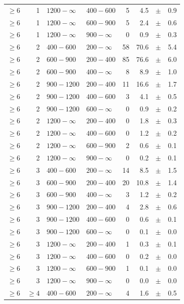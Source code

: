 \begin{table}[!h]
\begin{tabular}{rrllrrcl}
$\geq 6$ & 1 & $1200- \infty$ & $400-600$ &      5 &      4.5 &$\pm$&    0.9 \\
$\geq 6$ & 1 & $1200- \infty$ & $600-900$ &      5 &      2.4 &$\pm$&    0.6 \\
$\geq 6$ & 1 & $1200- \infty$ & $900-\infty$ &      0 &      0.9 &$\pm$&    0.3 \\
$\geq 6$\T & 2 & $ 400- 600$ & $200-\infty$ &     58 &     70.6 &$\pm$&    5.4 \\
$\geq 6$\T & 2 & $ 600- 900$ & $200-400$ &     85 &     76.6 &$\pm$&    6.0 \\
$\geq 6$ & 2 & $ 600- 900$ & $400-\infty$ &      8 &      8.9 &$\pm$&    1.0 \\
$\geq 6$\T & 2 & $ 900-1200$ & $200-400$ &     11 &     16.6 &$\pm$&    1.7 \\
$\geq 6$ & 2 & $ 900-1200$ & $400-600$ &      3 &      4.1 &$\pm$&    0.5 \\
$\geq 6$ & 2 & $ 900-1200$ & $600-\infty$ &      0 &      0.9 &$\pm$&    0.2 \\
$\geq 6$\T & 2 & $1200- \infty$ & $200-400$ &      0 &      1.8 &$\pm$&    0.3 \\
$\geq 6$ & 2 & $1200- \infty$ & $400-600$ &      0 &      1.2 &$\pm$&    0.2 \\
$\geq 6$ & 2 & $1200- \infty$ & $600-900$ &      2 &      0.6 &$\pm$&    0.1 \\
$\geq 6$ & 2 & $1200- \infty$ & $900-\infty$ &      0 &      0.2 &$\pm$&    0.1 \\
$\geq 6$\T & 3 & $ 400- 600$ & $200-\infty$ &     14 &      8.5 &$\pm$&    1.5 \\
$\geq 6$\T & 3 & $ 600- 900$ & $200-400$ &     20 &     10.8 &$\pm$&    1.4 \\
$\geq 6$ & 3 & $ 600- 900$ & $400-\infty$ &      3 &      1.2 &$\pm$&    0.2 \\
$\geq 6$\T & 3 & $ 900-1200$ & $200-400$ &      4 &      2.8 &$\pm$&    0.6 \\
$\geq 6$ & 3 & $ 900-1200$ & $400-600$ &      0 &      0.6 &$\pm$&    0.1 \\
$\geq 6$ & 3 & $ 900-1200$ & $600-\infty$ &      0 &      0.1 &$\pm$&    0.0 \\
$\geq 6$\T & 3 & $1200- \infty$ & $200-400$ &      1 &      0.3 &$\pm$&    0.1 \\
$\geq 6$ & 3 & $1200- \infty$ & $400-600$ &      0 &      0.2 &$\pm$&    0.0 \\
$\geq 6$ & 3 & $1200- \infty$ & $600-900$ &      1 &      0.1 &$\pm$&    0.0 \\
$\geq 6$ & 3 & $1200- \infty$ & $900-\infty$ &      0 &      0.0 &$\pm$&    0.0 \\
$\geq 6$\T & $\geq 4$ & $ 400- 600$ & $200-\infty$ &      4 &      1.6 &$\pm$&    0.5 \\
    \hline
  \end{tabular}
\end{table}

